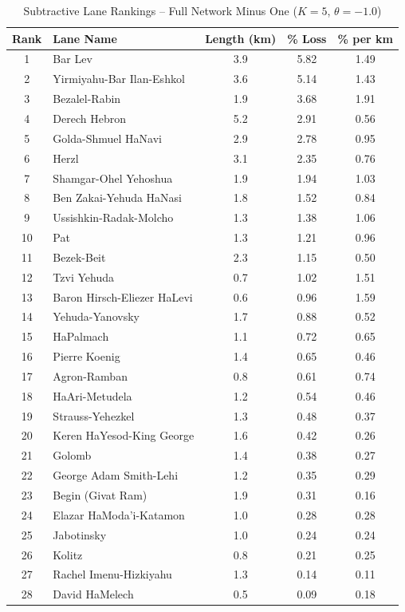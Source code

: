 \begin{table}[H]
\centering
\caption{Subtractive Lane Rankings -- Full Network Minus One ($K=5$, $\theta=-1.0$)}
\label{tab:subtractive_rankings}
\small
\begin{tabular}{@{}clccc@{}}
\toprule
\textbf{Rank} & \textbf{Lane Name} & \textbf{Length (km)} & \textbf{\% Loss} & \textbf{\% per km} \\
\midrule
1 & Bar Lev & 3.9 & 5.82 & 1.49 \\
2 & Yirmiyahu-Bar Ilan-Eshkol & 3.6 & 5.14 & 1.43 \\
3 & Bezalel-Rabin & 1.9 & 3.68 & 1.91 \\
4 & Derech Hebron & 5.2 & 2.91 & 0.56 \\
5 & Golda-Shmuel HaNavi & 2.9 & 2.78 & 0.95 \\
6 & Herzl & 3.1 & 2.35 & 0.76 \\
7 & Shamgar-Ohel Yehoshua & 1.9 & 1.94 & 1.03 \\
8 & Ben Zakai-Yehuda HaNasi & 1.8 & 1.52 & 0.84 \\
9 & Ussishkin-Radak-Molcho & 1.3 & 1.38 & 1.06 \\
10 & Pat & 1.3 & 1.21 & 0.96 \\
11 & Bezek-Beit & 2.3 & 1.15 & 0.50 \\
12 & Tzvi Yehuda & 0.7 & 1.02 & 1.51 \\
13 & Baron Hirsch-Eliezer HaLevi & 0.6 & 0.96 & 1.59 \\
14 & Yehuda-Yanovsky & 1.7 & 0.88 & 0.52 \\
15 & HaPalmach & 1.1 & 0.72 & 0.65 \\
16 & Pierre Koenig & 1.4 & 0.65 & 0.46 \\
17 & Agron-Ramban & 0.8 & 0.61 & 0.74 \\
18 & HaAri-Metudela & 1.2 & 0.54 & 0.46 \\
19 & Strauss-Yehezkel & 1.3 & 0.48 & 0.37 \\
20 & Keren HaYesod-King George & 1.6 & 0.42 & 0.26 \\
21 & Golomb & 1.4 & 0.38 & 0.27 \\
22 & George Adam Smith-Lehi & 1.2 & 0.35 & 0.29 \\
23 & Begin (Givat Ram) & 1.9 & 0.31 & 0.16 \\
24 & Elazar HaModa'i-Katamon & 1.0 & 0.28 & 0.28 \\
25 & Jabotinsky & 1.0 & 0.24 & 0.24 \\
26 & Kolitz & 0.8 & 0.21 & 0.25 \\
27 & Rachel Imenu-Hizkiyahu & 1.3 & 0.14 & 0.11 \\
28 & David HaMelech & 0.5 & 0.09 & 0.18 \\
\bottomrule
\end{tabular}
\end{table}

